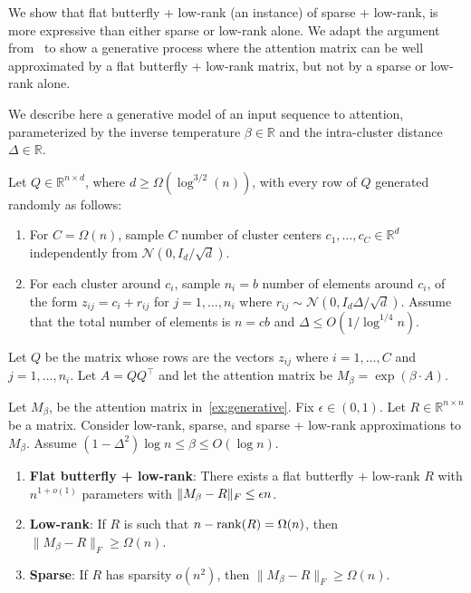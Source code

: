 We show that flat butterfly + low-rank (an instance) of sparse + low-rank, is
more expressive than either sparse or low-rank alone.
We adapt the argument from~\citet{scatterbrain} to show a generative process
where the attention matrix can be well approximated by a flat butterfly +
low-rank matrix, but not by a sparse or low-rank alone.

We describe here a generative model of an input sequence to attention, parameterized by the inverse temperature $\beta \in \mathbb{R}$ and the intra-cluster distance $\Delta \in \mathbb{R}$.
\begin{process}
  \label{ex:generative}
  Let $Q \in \mathbb{R}^{n \times d}$, where $d\geq\Omega(\log^{3/2}(n))$, with every row of $Q$ generated randomly as follows:
  \begin{enumerate}[leftmargin=*,nosep,nolistsep]
    \item For $C = \Omega(n)$, sample $C$ number of cluster centers $c_1, \dots, c_C \in \mathbb{R}^{d}$ independently from $\mathcal{N}(0, I_d/\sqrt{d})$.
    \item For each cluster around $c_i$, sample $n_i = b$ number of elements around $c_i$, of the form $z_{ij} = c_i + r_{ij}$ for $j = 1, \dots, n_i$ where $r_{ij} \sim \mathcal{N}(0, I_d \Delta/\sqrt{d})$.
    Assume that the total number of elements is $n = c b$ and $\Delta\leq O(1/\log^{1/4} n)$.
  \end{enumerate}
  Let $Q$ be the matrix whose rows are the vectors $z_{ij}$ where $i = 1, \dots, C$ and $j = 1, \dots, n_i$.
  Let $A = Q Q^\top$ and let the attention matrix be $M_\beta = \exp(\beta \cdot A)$.
\end{process}

\begin{theorem}
  \label{thm:temperature}
  Let $M_\beta$, be the attention matrix in~\cref{ex:generative}. Fix $\epsilon\in (0,1)$. Let $R \in \mathbb{R}^{n \times n}$ be a matrix.
  Consider low-rank, sparse, and sparse + low-rank approximations to $M_\beta$.
    Assume $(1 - \Delta^2) \log n  \leq \beta \leq O(\log n)$.
    \begin{enumerate}
        \item \textbf{Flat butterfly + low-rank}: There exists a flat butterfly + low-rank $R$ with $n^{1+o(1)}$ parameters with $\|M_\beta-R\|_F\leq \epsilon n$.
        \item \textbf{Low-rank}: If $R$ is such that $n-\mathrm{rank}(R)=\Omega(n)$, then $\|M_\beta-R\|_F\geq \Omega(n)$.
        \item \textbf{Sparse}: If $R$ has sparsity $o(n^2)$, then $\|M_\beta - R\|_F\geq \Omega(n)$.
   \end{enumerate}
\end{theorem}

